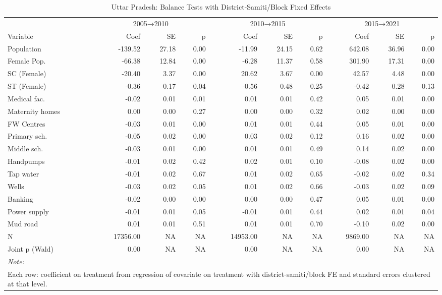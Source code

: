 \begin{table}
\centering
\caption{\label{tab:balance_fe_up}Uttar Pradesh: Balance Tests with District-Samiti/Block Fixed Effects}
\centering
\fontsize{8}{10}\selectfont
\begin{tabular}[t]{lrrrrrrrrr}
\toprule
\multicolumn{1}{c}{ } & \multicolumn{3}{c}{2005→2010} & \multicolumn{3}{c}{2010→2015} & \multicolumn{3}{c}{2015→2021} \\
\cmidrule(l{3pt}r{3pt}){2-4} \cmidrule(l{3pt}r{3pt}){5-7} \cmidrule(l{3pt}r{3pt}){8-10}
Variable & Coef & SE & p & Coef & SE & p & Coef & SE & p\\
\midrule
Population & -139.52 & 27.18 & 0.00 & -11.99 & 24.15 & 0.62 & 642.08 & 36.96 & 0.00\\
Female Pop. & -66.38 & 12.84 & 0.00 & -6.28 & 11.37 & 0.58 & 301.90 & 17.31 & 0.00\\
SC (Female) & -20.40 & 3.37 & 0.00 & 20.62 & 3.67 & 0.00 & 42.57 & 4.48 & 0.00\\
ST (Female) & -0.36 & 0.17 & 0.04 & -0.56 & 0.48 & 0.25 & -0.42 & 0.28 & 0.13\\
Medical fac. & -0.02 & 0.01 & 0.01 & 0.01 & 0.01 & 0.42 & 0.05 & 0.01 & 0.00\\
\addlinespace
Maternity homes & 0.00 & 0.00 & 0.27 & 0.00 & 0.00 & 0.32 & 0.02 & 0.00 & 0.00\\
FW Centres & -0.03 & 0.01 & 0.00 & 0.01 & 0.01 & 0.44 & 0.05 & 0.01 & 0.00\\
Primary sch. & -0.05 & 0.02 & 0.00 & 0.03 & 0.02 & 0.12 & 0.16 & 0.02 & 0.00\\
Middle sch. & -0.03 & 0.01 & 0.00 & 0.01 & 0.01 & 0.49 & 0.14 & 0.02 & 0.00\\
Handpumps & -0.01 & 0.02 & 0.42 & 0.02 & 0.01 & 0.10 & -0.08 & 0.02 & 0.00\\
\addlinespace
Tap water & -0.01 & 0.02 & 0.67 & 0.01 & 0.02 & 0.65 & -0.02 & 0.02 & 0.34\\
Wells & -0.03 & 0.02 & 0.05 & 0.01 & 0.02 & 0.66 & -0.03 & 0.02 & 0.09\\
Banking & -0.02 & 0.00 & 0.00 & 0.00 & 0.00 & 0.47 & 0.05 & 0.01 & 0.00\\
Power supply & -0.01 & 0.01 & 0.05 & -0.01 & 0.01 & 0.44 & 0.02 & 0.01 & 0.04\\
Mud road & 0.01 & 0.01 & 0.51 & 0.01 & 0.01 & 0.70 & -0.10 & 0.02 & 0.00\\
\addlinespace
N & 17356.00 & NA & NA & 14953.00 & NA & NA & 9869.00 & NA & NA\\
Joint p (Wald) & 0.00 & NA & NA & 0.00 & NA & NA & 0.00 & NA & NA\\
\bottomrule
\multicolumn{10}{l}{\rule{0pt}{1em}\textit{Note: }}\\
\multicolumn{10}{l}{\rule{0pt}{1em}Each row: coefficient on treatment from regression of covariate on treatment with district-samiti/block FE and standard errors clustered at that level.}\\
\end{tabular}
\end{table}
